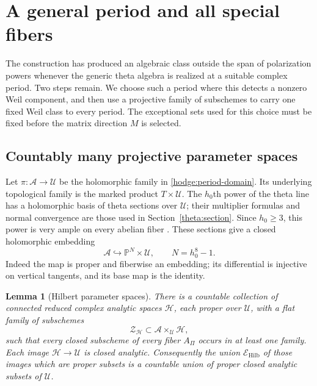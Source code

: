 \documentclass[11pt]{article}
\newtheorem{lemma}[theorem]{Lemma}
\theoremstyle{definition}
\theoremstyle{remark}
\numberwithin{equation}{section}
\begin{document}
\section{A general period and all special fibers}
\label{spread:section}

The construction has produced an algebraic class outside the span of
polarization powers whenever the generic theta algebra is realized at a
suitable complex period.  Two steps remain.  We choose such a period
where this detects a nonzero Weil component, and then use a projective
family of subschemes to carry one fixed Weil class to every period.
The exceptional sets used for this choice must be fixed before the
matrix direction $M$ is selected.

\subsection{Countably many projective parameter spaces}

Let $\pi:\mathscr A\to\mathcal U$ be the holomorphic family in
\eqref{hodge:period-domain}.  Its underlying topological family is the
marked product $T\times\mathcal U$.  The $h_0$th power of the theta
line has a holomorphic basis of theta sections over $\mathcal U$;
their multiplier formulas and normal convergence are those used in
Section~\ref{theta:section}.  Since $h_0\ge3$, this power is very ample
on every abelian fiber \cite{abelian-ampleness}.  These sections give a
closed holomorphic embedding
\begin{equation}
 \mathscr A\hookrightarrow\mathbb P^N\times\mathcal U,
 \qquad N=h_0^8-1.
 \label{spread:relative-embedding}
\end{equation}
Indeed the map is proper and fiberwise an embedding; its differential
is injective on vertical tangents, and its base map is the identity.

\begin{lemma}[Hilbert parameter spaces]
\label{spread:hilbert-loci}
There is a countable collection of connected reduced complex analytic
spaces $\mathcal H$, each proper over $\mathcal U$, with a flat family
of subschemes
\[
 \mathscr Z_{\mathcal H}\subset
       \mathscr A\times_{\mathcal U}\mathcal H,
\]
such that every closed subscheme of every fiber $A_\Pi$ occurs in at
least one family.  Each image $\mathcal H\to\mathcal U$ is closed
analytic.  Consequently the union $\mathcal E_{\mathrm{Hilb}}$ of
those images which are proper subsets is a countable union of proper
closed analytic subsets of $\mathcal U$.
\end{lemma}
\end{document}
